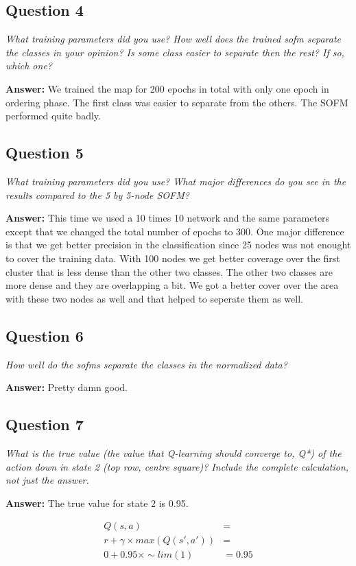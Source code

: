 \documentclass[a4paper]{article}
\begin{document}
\subsection*{Question 4}
\emph{What training parameters did you use? How well does the trained
sofm separate the classes in your opinion? Is some class easier to separate then the rest? If so, which one?}

\textbf{Answer:} We trained the map for 200 epochs in total with only one epoch in ordering phase. The first class was easier to separate from the others. The SOFM performed quite badly. 

\subsection*{Question 5}
\emph{What training parameters did you use? What  major differences
do you see in the results compared to the 5 by 5-node SOFM?}

\textbf{Answer:} This time we used a 10 times 10 network and the same parameters except that we changed the total number of epochs to 300. One major difference is that we get better precision in the classification since 25 nodes was not enought to cover the training data. With 100 nodes we get better coverage over the first cluster that is less dense than the other two classes. The other two classes are more dense and they are overlapping a bit. We got a better cover over the area with these two nodes as well and that helped to seperate them as well.

\subsection*{Question 6}
\emph{How well do the sofms separate the classes in the normalized
data?}

\textbf{Answer:} 
Pretty damn good.

\subsection*{Question 7}
\emph{What is the true value (the value that Q-learning should converge
to, Q*) of the action down in state 2 (top row, centre square)? Include the complete calculation, not just the answer.}

\textbf{Answer:} The true value for state 2 is 0.95.

\begin{align*}
Q(s, a)                    &= \\
r + \gamma \times max(Q(s', a'))   &= \\
0 + 0.95 \times \sim lim(1) &= 0.95 \\
\end{align*}
\end{document}
